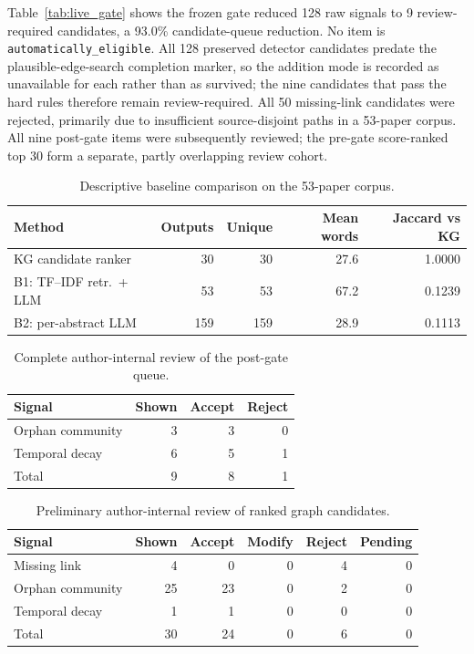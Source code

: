 \documentclass[conference, onecolumn]{IEEEtran}
\newcommand{\statuseligible}{\texttt{automatically\_eligible}}
\begin{document}
Table~\ref{tab:live_gate} shows the frozen gate reduced 128 raw signals to 9 review-required candidates, a 93.0\% candidate-queue reduction. No item is \statuseligible{}. All 128 preserved detector candidates predate the plausible-edge-search completion marker, so the addition mode is recorded as unavailable for each rather than as survived; the nine candidates that pass the hard rules therefore remain review-required. All 50 missing-link candidates were rejected, primarily due to insufficient source-disjoint paths in a 53-paper corpus. All nine post-gate items were subsequently reviewed; the pre-gate score-ranked top 30 form a separate, partly overlapping review cohort.

\begin{table}[t]
\caption{Descriptive baseline comparison on the 53-paper corpus.}
\label{tab:baselines}
\centering
\begin{tabular}{L{3.0cm}rrrr}
\toprule
Method & Outputs & Unique & Mean words & Jaccard vs KG\\
\midrule
KG candidate ranker & 30 & 30 & 27.6 & 1.0000\\
B1: TF--IDF retr.\ + LLM & 53 & 53 & 67.2 & 0.1239\\
B2: per-abstract LLM & 159 & 159 & 28.9 & 0.1113\\
\bottomrule
\end{tabular}
\end{table}

\begin{table}[t]
\caption{Complete author-internal review of the post-gate queue.}
\label{tab:postgate_review}
\centering
\begin{tabular}{lrrr}
\toprule
Signal & Shown & Accept & Reject\\
\midrule
Orphan community & 3 & 3 & 0\\
Temporal decay & 6 & 5 & 1\\
\midrule
Total & 9 & 8 & 1\\
\bottomrule
\end{tabular}
\end{table}

\begin{table}[t]
\caption{Preliminary author-internal review of ranked graph candidates.}
\label{tab:review}
\centering
\begin{tabular}{lrrrrr}
\toprule
Signal & Shown & Accept & Modify & Reject & Pending\\
\midrule
Missing link & 4 & 0 & 0 & 4 & 0\\
Orphan community & 25 & 23 & 0 & 2 & 0\\
Temporal decay & 1 & 1 & 0 & 0 & 0\\
\midrule
Total & 30 & 24 & 0 & 6 & 0\\
\bottomrule
\end{tabular}
\end{table}
\end{document}
